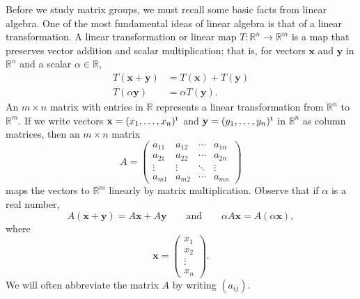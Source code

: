 Before we study matrix groups, we must recall some basic facts from
linear algebra.  One of the most fundamental ideas of linear algebra
is that of a linear transformation. A {\bfi linear
transformation\/} or {\bfi 
linear map} $T : {\mathbb R}^n \rightarrow {\mathbb R}^m$
is a map that preserves vector addition and scalar multiplication;
that is, for vectors ${\mathbf x}$ and ${\mathbf y}$ in ${\mathbb R}^n$ and a
scalar $\alpha \in {\mathbb R}$, 
\begin{align*}
T({\mathbf x}+{\mathbf y}) & = T({\mathbf x}) + T({\mathbf y}) \\
T(\alpha {\mathbf y}) & = \alpha T({\mathbf y}).
\end{align*}
An $m \times n$ matrix with entries in ${\mathbb R}$ represents a linear
transformation from ${\mathbb R}^n$ to ${\mathbb R}^m$. If we write vectors
${\mathbf x} = (x_1, \ldots, x_n)^{\rm t}$ and ${\mathbf y} = (y_1,
\ldots, y_n)^{\rm t}$ in ${\mathbb R}^n$ as column matrices, then an $m
\times n$ matrix 
\[
A
=
\begin{pmatrix}
a_{11} & a_{12} & \cdots & a_{1n} \\
a_{21} & a_{22} & \cdots & a_{2n} \\
\vdots & \vdots & \ddots & \vdots \\
a_{m1} & a_{m2} & \cdots & a_{mn}
\end{pmatrix}
\]
maps the vectors to ${\mathbb R}^m$ linearly by matrix
multiplication.  Observe that if $\alpha$ is a real number,
\[
A({\mathbf x} + {\mathbf y} ) 
 = 
A {\mathbf x }+ A {\mathbf y} 
\qquad \text{and} \qquad
\alpha A {\mathbf x} 
 = 
A ( \alpha {\mathbf x}),
\]
where
\[
{\mathbf x}
=
\begin{pmatrix}
x_1 \\
x_2 \\
\vdots \\
x_n
\end{pmatrix}.
\]
We will often abbreviate the matrix $A$ by writing
$(a_{ij})$\label{matrixnote}.  
 
